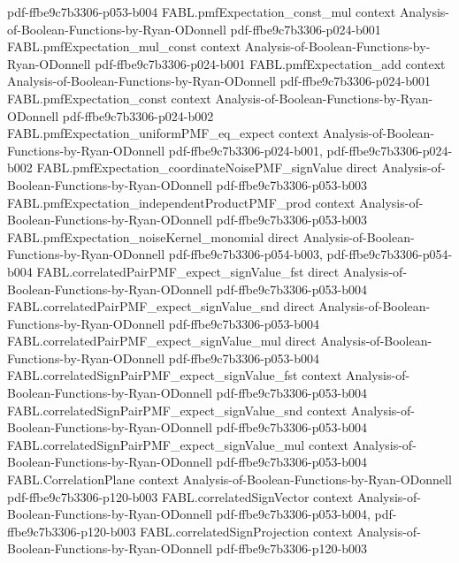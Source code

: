 \begin{theorem}
  {pdf-ffbe9c7b3306-p053-b004}
\proofstep
  {FABL.pmfExpectation_const_mul}
  {context}
  {Analysis-of-Boolean-Functions-by-Ryan-ODonnell}
  {pdf-ffbe9c7b3306-p024-b001}
\proofstep
  {FABL.pmfExpectation_mul_const}
  {context}
  {Analysis-of-Boolean-Functions-by-Ryan-ODonnell}
  {pdf-ffbe9c7b3306-p024-b001}
\proofstep
  {FABL.pmfExpectation_add}
  {context}
  {Analysis-of-Boolean-Functions-by-Ryan-ODonnell}
  {pdf-ffbe9c7b3306-p024-b001}
\proofstep
  {FABL.pmfExpectation_const}
  {context}
  {Analysis-of-Boolean-Functions-by-Ryan-ODonnell}
  {pdf-ffbe9c7b3306-p024-b002}
\proofstep
  {FABL.pmfExpectation_uniformPMF_eq_expect}
  {context}
  {Analysis-of-Boolean-Functions-by-Ryan-ODonnell}
  {pdf-ffbe9c7b3306-p024-b001,
    pdf-ffbe9c7b3306-p024-b002}
\proofstep
  {FABL.pmfExpectation_coordinateNoisePMF_signValue}
  {direct}
  {Analysis-of-Boolean-Functions-by-Ryan-ODonnell}
  {pdf-ffbe9c7b3306-p053-b003}
\proofstep
  {FABL.pmfExpectation_independentProductPMF_prod}
  {context}
  {Analysis-of-Boolean-Functions-by-Ryan-ODonnell}
  {pdf-ffbe9c7b3306-p053-b003}
\proofstep
  {FABL.pmfExpectation_noiseKernel_monomial}
  {direct}
  {Analysis-of-Boolean-Functions-by-Ryan-ODonnell}
  {pdf-ffbe9c7b3306-p054-b003,
    pdf-ffbe9c7b3306-p054-b004}
\proofstep
  {FABL.correlatedPairPMF_expect_signValue_fst}
  {direct}
  {Analysis-of-Boolean-Functions-by-Ryan-ODonnell}
  {pdf-ffbe9c7b3306-p053-b004}
\proofstep
  {FABL.correlatedPairPMF_expect_signValue_snd}
  {direct}
  {Analysis-of-Boolean-Functions-by-Ryan-ODonnell}
  {pdf-ffbe9c7b3306-p053-b004}
\proofstep
  {FABL.correlatedPairPMF_expect_signValue_mul}
  {direct}
  {Analysis-of-Boolean-Functions-by-Ryan-ODonnell}
  {pdf-ffbe9c7b3306-p053-b004}
\proofstep
  {FABL.correlatedSignPairPMF_expect_signValue_fst}
  {context}
  {Analysis-of-Boolean-Functions-by-Ryan-ODonnell}
  {pdf-ffbe9c7b3306-p053-b004}
\proofstep
  {FABL.correlatedSignPairPMF_expect_signValue_snd}
  {context}
  {Analysis-of-Boolean-Functions-by-Ryan-ODonnell}
  {pdf-ffbe9c7b3306-p053-b004}
\proofstep
  {FABL.correlatedSignPairPMF_expect_signValue_mul}
  {context}
  {Analysis-of-Boolean-Functions-by-Ryan-ODonnell}
  {pdf-ffbe9c7b3306-p053-b004}
\proofstep
  {FABL.CorrelationPlane}
  {context}
  {Analysis-of-Boolean-Functions-by-Ryan-ODonnell}
  {pdf-ffbe9c7b3306-p120-b003}
\proofstep
  {FABL.correlatedSignVector}
  {context}
  {Analysis-of-Boolean-Functions-by-Ryan-ODonnell}
  {pdf-ffbe9c7b3306-p053-b004,
    pdf-ffbe9c7b3306-p120-b003}
\proofstep
  {FABL.correlatedSignProjection}
  {context}
  {Analysis-of-Boolean-Functions-by-Ryan-ODonnell}
  {pdf-ffbe9c7b3306-p120-b003}

\end{theorem}
